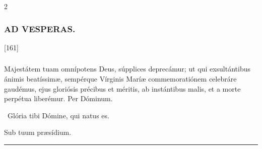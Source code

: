 \documentclass[9pt,twoside]{extarticle}
\begin{document}
\begin{multicols}{2}
\subsubsection*{\center \textsc{AD VESPERAS.}}
\begin{tightlist}{}
\item {} [161] 
\end{tightlist}


\subsubsection*{\center {}}
\lettrine{M}ajestátem tuam omnípotens Deus, súpplices deprecámur; ut qui exsultántibus ánimis beatíssimæ, sempérque Vírginis Maríæ commemoratiónem celebráre gaudémus, ejus gloriósis précibus et méritis, ab instántibus malis, et a morte perpétua liberémur. Per Dóminum.

\begin{tightlist}{}
\item {}~Glória tibi Dómine, qui natus es.
\item {} Sub tuum præsídium.
\end{tightlist}

\begin{center}\textcolor{red}{\rule{\linewidth}{0.5pt}} \end{center}


\end{multicols}
\end{document}
